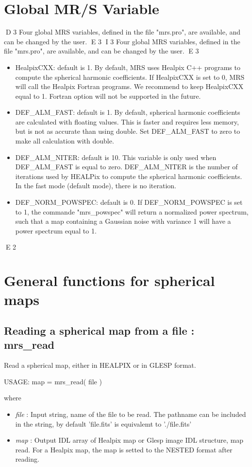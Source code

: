 \section{Global MR/S Variable}
D 3
Four global MRS variables, defined in the file "mrs.pro",  are available, and can be changed by the user.
E 3
I 3
Four global MRS variables, defined in the file "mrs.pro", are available, and can be changed by the user.
E 3
\begin{itemize}
\item HealpixCXX: default is 1. By default, MRS uses Healpix C++ programs to compute the spherical harmonic coefficients. 
If HealpixCXX is set to 0, MRS will call the Healpix  Fortran programs. We recommend to keep HealpixCXX equal to 1. Fortran option
will not be supported in the future.
\item DEF\_ALM\_FAST: default is 1. By default, spherical harmonic coefficients are calculated with floating values. This is faster and requires less
memory, but is not as accurate than using double. Set DEF\_ALM\_FAST to zero to make all calculation with double.
\item DEF\_ALM\_NITER: default is 10. This variable is only used when DEF\_ALM\_FAST is equal to zero. DEF\_ALM\_NITER is the number of iterations
used by HEALPix to compute the spherical harmonic coefficients. In the fast mode (default mode), there is no iteration.
\item DEF\_NORM\_POWSPEC: default is 0. If DEF\_NORM\_POWSPEC is set to 1, the commande "mrs\_powspec" will return a normalized power spectrum, 
such that a map containing a Gaussian noise with variance 1 will have a power spectrum equal to 1. 
\end{itemize}
E 2


\section{General functions for spherical maps}

\subsection{Reading a spherical map from a file : mrs\_read}
Read a spherical map, either in HEALPIX or in GLESP format.
{\bf
\begin{center}
     USAGE: map = mrs\_read( file )
\end{center}}
where
\begin{itemize}
\item {\em file} : Input string, name of the file to be read. The pathname can be included in the string, by default 'file.fits' is equivalemt to './file.fits'
\item {\em map} : Output IDL array of Healpix map or Glesp image IDL structure, map read. For a Healpix map, the map is setted to the NESTED format after reading.
\end{itemize}

